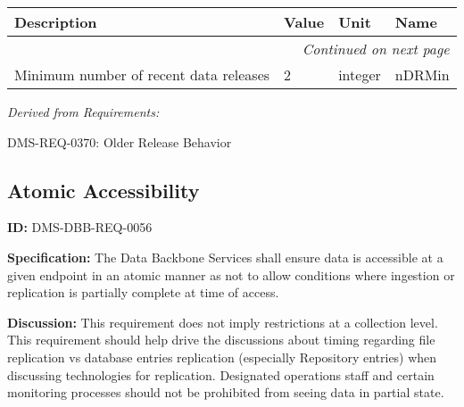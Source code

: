 \documentclass[SE,toc]{lsstdoc}
\makeatletter
\newcommand{\paramname}[1]{\hspace{0pt}#1}
\newcommand{\unitname}[1]{\hspace{0pt}#1}
\newcommand{\addendum}{}
\newenvironment{parameters}[0]{%
\setlength\LTleft{0pt}
\setlength\LTright{\fill}
\begin{small}
\begin{longtable}[]{|p{0.49\textwidth}|l|p{0.6in}|p{1.70in}@{}|}

\hline \textbf{Description} & \textbf{Value} & \textbf{Unit} & \textbf{Name} \\ \hline
\endhead

\hline \multicolumn{4}{r}{\emph{Continued on next page}} \\
\endfoot

\hline\hline
\endlastfoot
}{%
\hline
\end{longtable}
\end{small}
}
\makeatother
\begin{document}
\begin{parameters}
Minimum number of recent data releases
&
2
&
\unitname{%
integer
}
&
\paramname{%
nDRMin
} \\\hline
\end{parameters}

\emph{Derived from Requirements:}

DMS-REQ-0370:
Older Release Behavior \newline

\subsection{Atomic Accessibility}

\label{DMS-DBB-REQ-0056}
\textbf{ID:} DMS-DBB-REQ-0056

\textbf{Specification:}
The Data Backbone Services shall ensure data is accessible at a given endpoint in an atomic manner as not to allow conditions where ingestion or replication is partially complete at time of access.

\textbf{Discussion:}
This requirement does not imply restrictions at a collection level.  This requirement should help drive the discussions about timing regarding file replication vs database entries replication (especially Repository entries) when discussing technologies for replication.    Designated operations staff and certain monitoring processes should not be prohibited from seeing data in partial state.

\addendum


\end{document}
